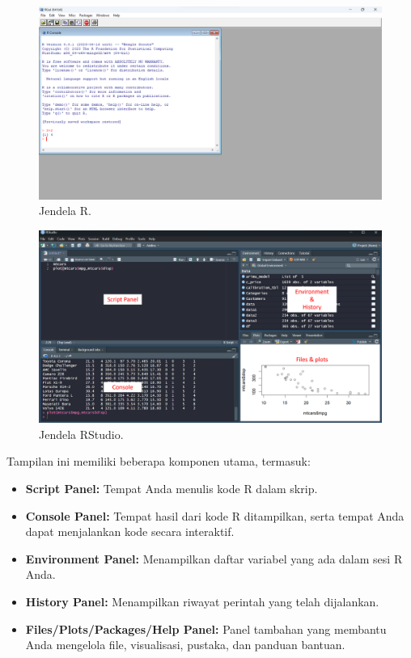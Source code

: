 \documentclass[
]{book}
\providecommand{\tightlist}{%
  \setlength{\itemsep}{0pt}\setlength{\parskip}{0pt}}
\begin{document}
\begin{figure}

{\centering \includegraphics[width=1\linewidth]{./images/Bab1/jendela_r} 

}

\caption{Jendela R.}\label{fig:jendela-R}
\end{figure}

\begin{figure}

{\centering \includegraphics[width=1\linewidth]{./images/Bab1/Rstudio} 

}

\caption{Jendela RStudio.}\label{fig:jendela-RStudio}
\end{figure}

Tampilan ini memiliki beberapa komponen utama, termasuk:

\begin{itemize}
\tightlist
\item
  \textbf{Script Panel:} Tempat Anda menulis kode R dalam skrip.
\item
  \textbf{Console Panel:} Tempat hasil dari kode R ditampilkan, serta tempat Anda dapat menjalankan kode secara interaktif.
\item
  \textbf{Environment Panel:} Menampilkan daftar variabel yang ada dalam sesi R Anda.
\item
  \textbf{History Panel:} Menampilkan riwayat perintah yang telah dijalankan.
\item
  \textbf{Files/Plots/Packages/Help Panel:} Panel tambahan yang membantu Anda mengelola file, visualisasi, pustaka, dan panduan bantuan.
\end{itemize}
\end{document}
